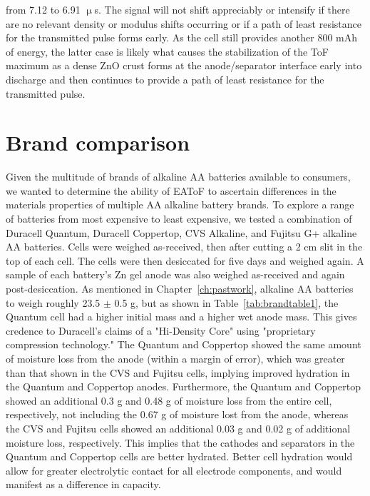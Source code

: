 from 7.12 to 6.91 $\upmu$s. The signal will not shift appreciably or intensify if there are no relevant density or modulus shifts occurring or if a path of least resistance for the transmitted pulse forms early. As the cell still provides another 800 mAh of energy, the latter case is likely what causes the stabilization of the ToF maximum as a dense ZnO crust forms at the anode/separator interface early into discharge and then continues to provide a path of least resistance for the transmitted pulse.

\section{Brand comparison}

Given the multitude of brands of alkaline AA batteries available to consumers, we wanted to determine the ability of EAToF to ascertain differences in the materials properties of multiple AA alkaline battery brands. To explore a range of batteries from most expensive to least expensive, we tested a combination of Duracell Quantum, Duracell Coppertop, CVS Alkaline, and Fujitsu G+ alkaline AA batteries. Cells were weighed as-received, then after cutting a 2 cm slit in the top of each cell. The cells were then desiccated for five days and weighed again. A sample of each battery’s Zn gel anode was also weighed as-received and again post-desiccation. As mentioned in Chapter~\ref{ch:pastwork}, alkaline AA batteries to weigh roughly 23.5 $\pm$ 0.5 g, but as shown in Table~\ref{tab:brandtable1}, the Quantum cell had a higher initial mass and a higher wet anode mass. This gives credence to Duracell's claims of a "Hi-Density Core" using "proprietary compression technology."\cite{duracell} The Quantum and Coppertop showed the same amount of moisture loss from the anode (within a margin of error), which was greater than that shown in the CVS and Fujitsu cells, implying improved hydration in the Quantum and Coppertop anodes. Furthermore, the Quantum and Coppertop showed an additional 0.3 g and 0.48 g of moisture loss from the entire cell, respectively, not including the 0.67 g of moisture lost from the anode, whereas the CVS and Fujitsu cells showed an additional 0.03 g and 0.02 g of additional moisture loss, respectively. This implies that the cathodes and separators in the Quantum and Coppertop cells are better hydrated. Better cell hydration would allow for greater electrolytic contact for all electrode components, and would manifest as a difference in capacity.

